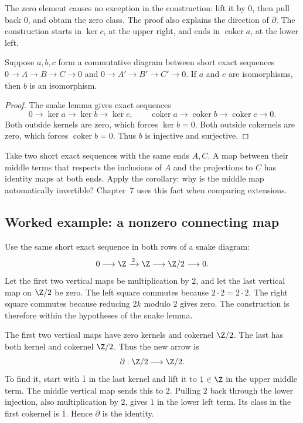 The zero element causes no exception in the construction: lift it by $0$, then pull back $0$, and obtain the zero class. The proof also explains the direction of $\partial$. The construction starts in $\ker c$, at the upper right, and ends in $\operatorname{coker}a$, at the lower left.

\begin{corollary}\label{cor:fivelemma}
Suppose $a,b,c$ form a commutative diagram between short exact sequences $0\to A\to B\to C\to0$ and $0\to A'\to B'\to C'\to0$. If $a$ and $c$ are isomorphisms, then $b$ is an isomorphism.
\end{corollary}

\begin{proof}
The snake lemma gives exact sequences
\[
0\to\ker a\to\ker b\to\ker c,
\qquad
\operatorname{coker}a\to\operatorname{coker}b
\to\operatorname{coker}c\to0.
\]
Both outside kernels are zero, which forces $\ker b=0$. Both outside cokernels are zero, which forces $\operatorname{coker}b=0$. Thus $b$ is injective and surjective.
\end{proof}

\begin{think}
Take two short exact sequences with the same ends $A,C$. A map between their middle terms that respects the inclusions of $A$ and the projections to $C$ has identity maps at both ends. Apply the corollary: why is the middle map automatically invertible? Chapter~7 uses this fact when comparing extensions.
\end{think}


\subsection*{Worked example: a nonzero connecting map}

Use the same short exact sequence in both rows of a snake diagram:
\[
0\longrightarrow\Z\xrightarrow{\,2\,}\Z
 \longrightarrow\Z/2\longrightarrow0.
\]
Let the first two vertical maps be multiplication by $2$, and let the last vertical map on $\Z/2$ be zero. The left square commutes because $2\cdot2=2\cdot2$. The right square commutes because reducing $2k$ modulo $2$ gives zero. The construction is therefore within the hypotheses of the snake lemma.

The first two vertical maps have zero kernels and cokernel $\Z/2$. The last has both kernel and cokernel $\Z/2$. Thus the new arrow is
\[
\partial:\Z/2\longrightarrow\Z/2.
\]
To find it, start with $\bar1$ in the last kernel and lift it to $1\in\Z$ in the upper middle term. The middle vertical map sends this to $2$. Pulling $2$ back through the lower injection, also multiplication by $2$, gives $1$ in the lower left term. Its class in the first cokernel is $\bar1$. Hence $\partial$ is the identity.

